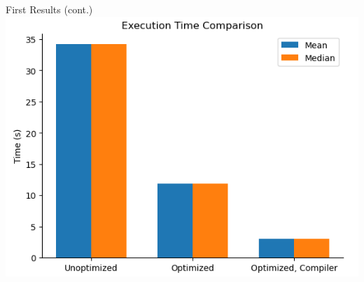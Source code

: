 \documentclass[compress,aspectratio=169]{beamer}
\begin{document}
\begin{frame}{First Results (cont.)}
\centering
    \includegraphics[height=.9\textheight]{../assets/ndim_first_bench.png}
\end{frame}
\end{document}
